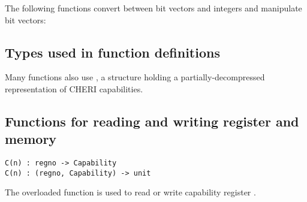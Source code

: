 The following functions convert between bit vectors and integers and manipulate bit vectors:

\medskip
{}


\label{sailRISCVzEXTZ}

\label{sailRISCVzEXTS}

\label{sailRISCVzzzeros}

\label{sailRISCVzones}

\subsection*{Types used in function definitions}

Many functions also use , a structure holding a
partially-decompressed representation of CHERI capabilities.
%


\subsection*{Functions for reading and writing register and memory}

\begin{lstlisting}[language=sail,label=sailRISCVzC]
C(n) : regno -> Capability
C(n) : (regno, Capability) -> unit
\end{lstlisting}
The overloaded function  is used to read or write capability register .

